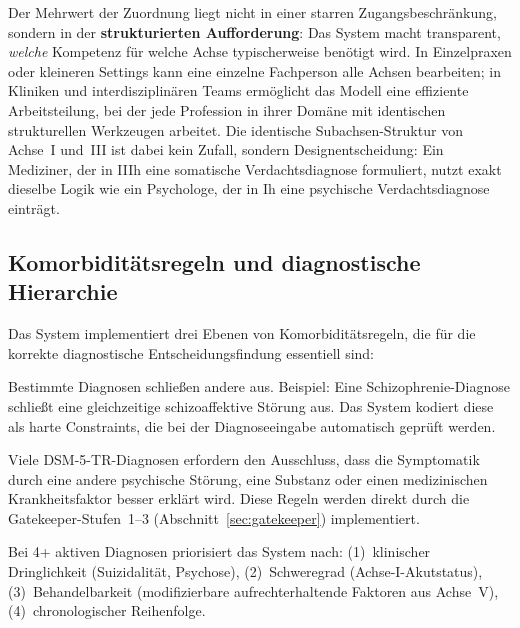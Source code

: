\documentclass[11pt,a4paper]{article}
\begin{document}
Der Mehrwert der Zuordnung liegt nicht in einer starren Zugangsbeschr\"ankung, sondern in der \textbf{strukturierten Aufforderung}: Das System macht transparent, \textit{welche} Kompetenz f\"ur welche Achse typischerweise ben\"otigt wird. In Einzelpraxen oder kleineren Settings kann eine einzelne Fachperson alle Achsen bearbeiten; in Kliniken und interdisziplin\"aren Teams erm\"oglicht das Modell eine effiziente Arbeitsteilung, bei der jede Profession in ihrer Dom\"ane mit identischen strukturellen Werkzeugen arbeitet. Die identische Subachsen-Struktur von Achse~I und~III ist dabei kein Zufall, sondern Designentscheidung: Ein Mediziner, der in IIIh eine somatische Verdachtsdiagnose formuliert, nutzt exakt dieselbe Logik wie ein Psychologe, der in Ih eine psychische Verdachtsdiagnose eintr\"agt.

\subsection{Komorbidit\"atsregeln und diagnostische Hierarchie}
\label{sec:komorbiditaet}

Das System implementiert drei Ebenen von Komorbidit\"atsregeln, die f\"ur die korrekte diagnostische Entscheidungsfindung essentiell sind:

\begin{description}[style=nextline, leftmargin=1.5cm, font=\bfseries]
\item[Hierarchische Exklusionsregeln] Bestimmte Diagnosen schlie\ss{}en andere aus. Beispiel: Eine Schizophrenie-Diagnose schlie\ss{}t eine gleichzeitige schizoaffektive St\"orung aus. Das System kodiert diese als harte Constraints, die bei der Diagnoseeingabe automatisch gepr\"uft werden.
\item[\glqq Due to another condition\grqq{}-Regeln] Viele DSM-5-TR-Diagnosen erfordern den Ausschluss, dass die Symptomatik durch eine andere psychische St\"orung, eine Substanz oder einen medizinischen Krankheitsfaktor besser erkl\"art wird. Diese Regeln werden direkt durch die Gatekeeper-Stufen~1--3 (Abschnitt~\ref{sec:gatekeeper}) implementiert.
\item[Erlaubte Komorbidit\"aten mit Priorisierung] Bei 4+ aktiven Diagnosen priorisiert das System nach: (1)~klinischer Dringlichkeit (Suizidalit\"at, Psychose), (2)~Schweregrad (Achse-I-Akutstatus), (3)~Behandelbarkeit (modifizierbare aufrechterhaltende Faktoren aus Achse~V), (4)~chronologischer Reihenfolge.
\end{description}
\end{document}
